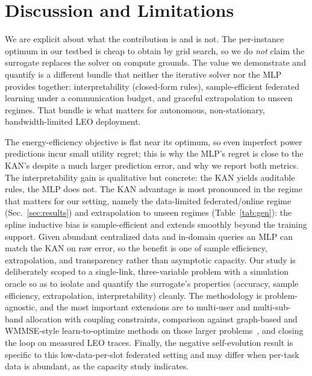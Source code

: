 \documentclass[journal]{IEEEtran}
\begin{document}
\section{Discussion and Limitations}\label{sec:disc}
We are explicit about what the contribution is and is not. The per-instance optimum
in our testbed is cheap to obtain by grid search, so we do \emph{not} claim the
surrogate replaces the solver on compute grounds. The value we demonstrate and
quantify is a different bundle that neither the iterative solver nor the MLP
provides together:
interpretability (closed-form rules), sample-efficient federated learning under a
communication budget, and graceful extrapolation to unseen regimes. That bundle is
what matters for autonomous, non-stationary, bandwidth-limited LEO deployment.

The energy-efficiency objective is flat near its optimum, so even imperfect power
predictions incur small utility regret; this is why the MLP's regret is close to
the KAN's despite a much larger prediction error, and why we report both metrics.
The interpretability gain is qualitative but concrete: the KAN yields auditable
rules, the MLP does not. The KAN advantage is most pronounced in the regime that
matters for our setting, namely the data-limited federated/online regime
(Sec.~\ref{sec:results}) and extrapolation to unseen regimes
(Table~\ref{tab:gen}): the spline inductive bias is sample-efficient and
extends smoothly beyond the training support. Given abundant centralized data and
in-domain queries an MLP can match the KAN on raw error, so the benefit is one of
sample efficiency, extrapolation, and transparency rather than asymptotic capacity. Our study is deliberately scoped to a single-link, three-variable problem with a
simulation oracle so as to isolate and quantify the surrogate's properties
(accuracy, sample efficiency, extrapolation, interpretability) cleanly. The
methodology is problem-agnostic, and the most important extensions are to
multi-user and multi-sub-band allocation with coupling constraints, comparison
against graph-based and WMMSE-style learn-to-optimize methods on those larger
problems~\cite{sun2018l2o,shen2021gnn}, and closing the loop on measured LEO
traces. Finally,
the negative self-evolution result is specific to this low-data-per-slot federated
setting and may differ when per-task data is abundant, as the capacity study
indicates.
\end{document}
